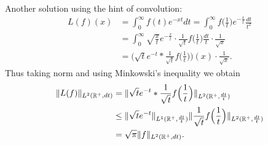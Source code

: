 \begin{enumerate}
Another solution using the hint of convolution:
\begin{align*}
L(f)(x) 
&=\int_0^{\infty}{f(t) e^{-xt}dt}
=\int_0^{\infty}{f\Big(\frac{1}{t}\Big) e^{-\frac{x}{t}}\frac{dt}{t^2}}\\
&=\int_0^{\infty}{\sqrt{\frac{x}{t}}e^{-\frac{x}{t}}
\cdot \frac{1}{\sqrt{t}}f\Big(\frac{1}{t}\Big) \frac{dt}{t}}
\cdot \frac{1}{\sqrt{x}}\\
&=\bigg(\sqrt{t}e^{-t}*\frac{1}{\sqrt{t}}f\Big(\frac{1}{t}\Big)\bigg) (x) 
\cdot \frac{1}{\sqrt{x}}.
\end{align*}
Thus taking norm and using Minkowski's inequality we obtain
\begin{align*}
\Vert L(f) \Vert_{L^2(\mathbb{R}^+,dt)}
&=\Vert \sqrt{t}e^{-t}*\frac{1}{\sqrt{t}}f\Big(\frac{1}{t}\Big) \Vert_{L^2(\mathbb{R}^+,\frac{dt}{t})}\\
&\le \Vert \sqrt{t}e^{-t} \Vert_{L^1(\mathbb{R}^+,\frac{dt}{t})}
\Vert \frac{1}{\sqrt{t}}f\Big(\frac{1}{t}\Big) \Vert_{L^2(\mathbb{R}^+,\frac{dt}{t})}\\
&=\sqrt{\pi}\Vert f \Vert_{L^2(\mathbb{R}^+,dt)}.
\end{align*}


\end{enumerate}
